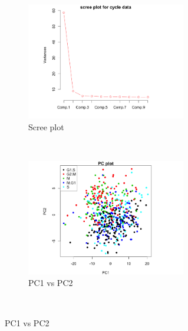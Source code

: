 \documentclass[11pt]{article}
\begin{document}
 \begin{figure}[ht]
    \centering    
     \begin{subfigure}[t]{0.5\textwidth}
        \centering
        \includegraphics[height=2in]{../figures/cell_order_R_figs/scree_plot.png}
        \caption{Scree plot}
    \end{subfigure}%
    ~
    \begin{subfigure}[t]{0.5\textwidth}
        \centering
        \includegraphics[height=2in]{../figures/cell_order_R_figs/PC_plot_12.png}
        \caption{PC1 vs PC2}
    \end{subfigure}\\


\end{figure}
\end{document}
